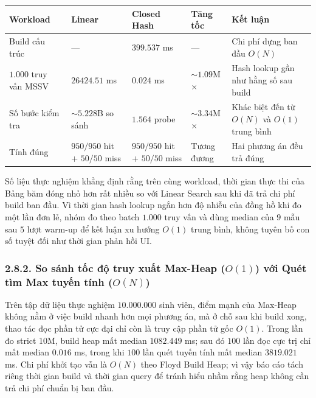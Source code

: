 \documentclass[14pt,a4paper]{extarticle}
\begin{document}
\begin{table}[H]
\centering
\begingroup
\begin{singlespace}
\setlength{\tabcolsep}{3pt}
\renewcommand{\arraystretch}{1.3}
\begin{tabularx}{\textwidth}{|>{\raggedright\arraybackslash}m{2.7cm}|>{\centering\arraybackslash}m{2.2cm}|>{\centering\arraybackslash}m{2.2cm}|>{\centering\arraybackslash}m{2.1cm}|>{\raggedright\arraybackslash}X|}
\hline
\textbf{Workload} & \textbf{Linear} & \textbf{Closed Hash} & \textbf{Tăng tốc} & \textbf{Kết luận} \\ \hline
Build cấu trúc & --- & $399.537$ ms & --- & Chi phí dựng ban đầu $O(N)$ \\ \hline
$1.000$ truy vấn MSSV & $26424.51$ ms & $0.024$ ms & $\sim 1.09$M$\times$ & Hash lookup gần như hằng số sau build \\ \hline
Số bước kiểm tra & $\sim 5.228$B so sánh & $1.564$ probe & $\sim 3.34$M$\times$ & Khác biệt đến từ $O(N)$ và $O(1)$ trung bình \\ \hline
Tính đúng & $950/950$ hit + $50/50$ miss & $950/950$ hit + $50/50$ miss & Tương đương & Hai phương án đều trả đúng \\ \hline
\end{tabularx}
\end{singlespace}
\endgroup
\end{table}

Số liệu thực nghiệm khẳng định rằng trên cùng workload, thời gian thực thi của Bảng băm đóng nhỏ hơn rất nhiều so với Linear Search sau khi đã trả chi phí build ban đầu. Vì thời gian hash lookup ngắn hơn độ nhiễu của đồng hồ khi đo một lần đơn lẻ, nhóm đo theo batch $1.000$ truy vấn và dùng median của $9$ mẫu sau $5$ lượt warm-up để kết luận xu hướng $O(1)$ trung bình, không tuyên bố con số tuyệt đối như thời gian phản hồi UI.

\subsubsection*{2.8.2. So sánh tốc độ truy xuất Max-Heap \texorpdfstring{($O(1)$)}{(O(1))} với Quét tìm Max tuyến tính \texorpdfstring{($O(N)$)}{(O(N))}}
{}

Trên tập dữ liệu thực nghiệm $10.000.000$ sinh viên, điểm mạnh của Max-Heap không nằm ở việc build nhanh hơn mọi phương án, mà ở chỗ sau khi build xong, thao tác đọc phần tử cực đại chỉ còn là truy cập phần tử gốc $O(1)$. Trong lần đo strict 10M, build heap mất median $1082.449$ ms; sau đó $100$ lần đọc cực trị chỉ mất median $0.016$ ms, trong khi $100$ lần quét tuyến tính mất median $3819.021$ ms. Chi phí khởi tạo vẫn là $O(N)$ theo Floyd Build Heap; vì vậy báo cáo tách riêng thời gian build và thời gian query để tránh hiểu nhầm rằng heap không cần trả chi phí chuẩn bị ban đầu.
\end{document}
